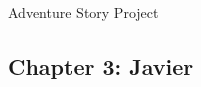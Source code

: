 \documentclass{article}
\begin{document}
\Huge Adventure Story Project

\subsection*{Chapter 3: Javier}
\end{document}
